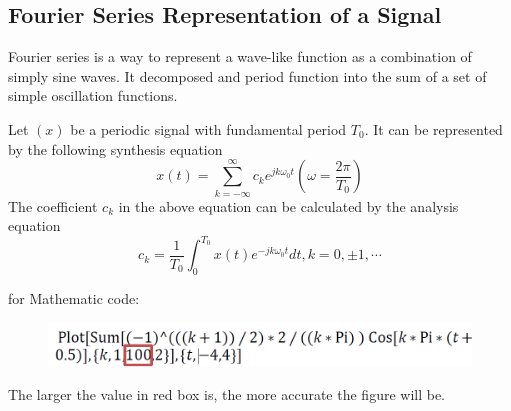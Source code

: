 \documentclass[12pt]{article}
\begin{document}
\subsection{Fourier Series Representation of a Signal}
Fourier series is a way to represent a wave-like function as a combination of
simply sine waves. It decomposed and period function into the sum of a set of simple oscillation functions.
\par Let $(x)$ be a periodic signal with fundamental period $T_0$. It can be represented by the following synthesis equation 
$$x(t)=\sum_{k=-\infty}^{\infty}c_ke^{jk\omega_0t}(\omega=\frac{2\pi}{T_0})$$
The coefficient $c_k$ in the above equation can be calculated by the analysis equation
$$c_k=\frac{1}{T_0}\int^{T_0}_0x(t)e^{-jk\omega_0t}dt,k=0,\pm1,\cdots$$
\par for Mathematic code:
\begin{figure}[H]
\centering
\includegraphics[scale=0.3]{P3.jpg}
\end{figure}
The larger the value in red box is, the more accurate the figure will be.
\end{document}
